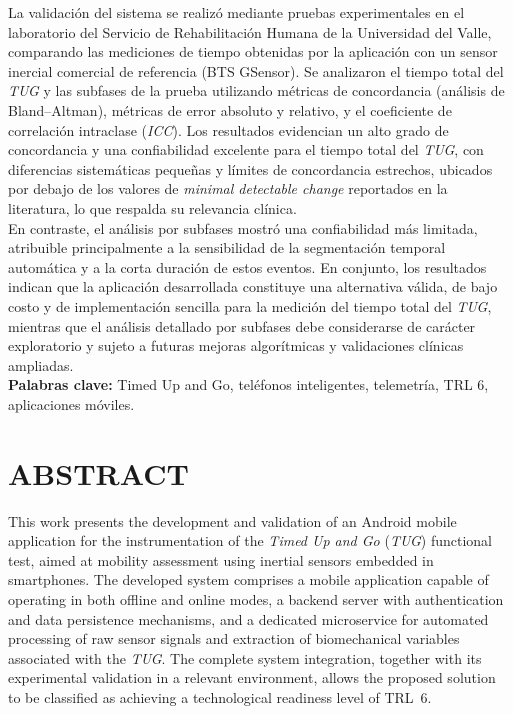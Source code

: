 \documentclass[12pt]{report}
\begin{document}
\begin{justify}
    La validación del sistema se realizó mediante pruebas experimentales en el laboratorio del Servicio de Rehabilitación Humana de la Universidad del Valle, comparando las mediciones de tiempo obtenidas por la aplicación con un sensor inercial comercial de referencia (BTS GSensor). Se analizaron el tiempo total del \textit{TUG} y las subfases de la prueba utilizando métricas de concordancia (análisis de Bland--Altman), métricas de error absoluto y relativo, y el coeficiente de correlación intraclase (\textit{ICC}). Los resultados evidencian un alto grado de concordancia y una confiabilidad excelente para el tiempo total del \textit{TUG}, con diferencias sistemáticas pequeñas y límites de concordancia estrechos, ubicados por debajo de los valores de \textit{minimal detectable change} reportados en la literatura, lo que respalda su relevancia clínica.\\

    En contraste, el análisis por subfases mostró una confiabilidad más limitada, atribuible principalmente a la sensibilidad de la segmentación temporal automática y a la corta duración de estos eventos. En conjunto, los resultados indican que la aplicación desarrollada constituye una alternativa válida, de bajo costo y de implementación sencilla para la medición del tiempo total del \textit{TUG}, mientras que el análisis detallado por subfases debe considerarse de carácter exploratorio y sujeto a futuras mejoras algorítmicas y validaciones clínicas ampliadas.\\


    \vspace{0.5cm}
    \noindent\textbf{Palabras clave:} Timed Up and Go, teléfonos inteligentes, telemetría, TRL 6, aplicaciones móviles.


    \vspace{1cm}


    {
        \centering \section*{ABSTRACT}
    }

    This work presents the development and validation of an Android mobile application for the instrumentation of the \textit{Timed Up and Go} (\textit{TUG}) functional test, aimed at mobility assessment using inertial sensors embedded in smartphones. The developed system comprises a mobile application capable of operating in both offline and online modes, a backend server with authentication and data persistence mechanisms, and a dedicated microservice for automated processing of raw sensor signals and extraction of biomechanical variables associated with the \textit{TUG}. The complete system integration, together with its experimental validation in a relevant environment, allows the proposed solution to be classified as achieving a technological readiness level of TRL~6.\\


\end{justify}
\end{document}
